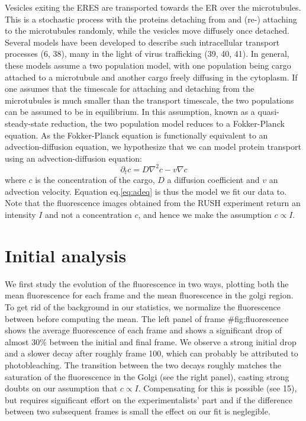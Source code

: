 \documentclass[12pt,a4paper,]{Dissertate}
\begin{document}
Vesicles exiting the ERES are transported towards the ER over the
microtubules. This is a stochastic process with the proteins detaching
from and (re-) attaching to the microtubules randomly, while the
vesicles move diffusely once detached. Several models have been
developed to describe such intracellular transport processes (6, 38),
many in the light of virus trafficking (39, 40, 41). In general, these
models assume a two population model, with one population being cargo
attached to a microtubule and another cargo freely diffusing in the
cytoplasm. If one assumes that the timescale for attaching and detaching
from the microtubules is much smaller than the transport timescale, the
two populations can be assumed to be in equilibrium. In this assumption,
known as a quasi-steady-state reduction, the two population model
reduces to a Fokker-Planck equation. As the Fokker-Planck equation is
functionally equivalent to an advection-diffusion equation, we
hypothesize that we can model protein transport using an
advection-diffusion equation: \begin{equation}
\partial_t c = D\nabla^2c-v\nabla c
\label{eq:adeq}\end{equation} where \(c\) is the concentration of the
cargo, \(D\) a diffusion coefficient and \(v\) an advection velocity.
Equation eq.\ref{eq:adeq} is thus the model we fit our data to. Note
that the fluorescence images obtained from the RUSH experiment return an
intensity \(I\) and not a concentration \(c\), and hence we make the
assumption \(c \propto I\).

\hypertarget{initial-analysis}{%
\section{Initial analysis}\label{initial-analysis}}

We first study the evolution of the fluorescence in two ways, plotting
both the mean fluorescence for each frame and the mean fluorescence in
the golgi region. To get rid of the background in our statistics, we
normalize the fluorescence between before computing the mean. The left
panel of frame \#fig:fluorescence shows the average fluorescence of each
frame and shows a significant drop of almost \(30\%\) between the
initial and final frame. We observe a strong initial drop and a slower
decay after roughly frame 100, which can probably be attributed to
photobleaching. The transition between the two decays roughly matches
the saturation of the fluorescence in the Golgi (see the right panel),
casting strong doubts on our assumption that \(c\propto I\).
Compensating for this is possible (see 15), but requires significant
effort on the experimentalists' part and if the difference between two
subsequent frames is small the effect on our fit is neglegible.
\end{document}
